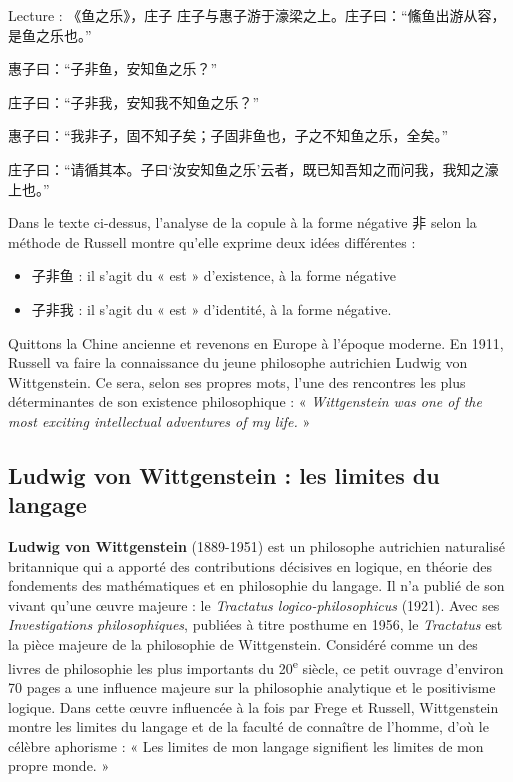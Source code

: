 \begin{lecture}{Lecture : 《鱼之乐》，庄子}
\normalfont
庄子与惠子游于濠梁之上。庄子曰：“鯈鱼出游从容，是鱼之乐也。”

惠子曰：“子非鱼，安知鱼之乐？”

庄子曰：“子非我，安知我不知鱼之乐？”

惠子曰：“我非子，固不知子矣；子固非鱼也，子之不知鱼之乐，全矣。”

庄子曰：“请循其本。子曰‘汝安知鱼之乐’云者，既已知吾知之而问我，我知之濠上也。”
\end{lecture}

Dans le texte ci-dessus, l’analyse de la copule à la forme négative 非 selon la méthode de Russell montre qu’elle exprime deux idées différentes :
\begin{itemize}
\item 子非鱼 : il s’agit du « est » d’existence, à la forme négative
\item 子非我 : il s’agit du « est » d’identité, à la forme négative.
\end{itemize}

Quittons la Chine ancienne et revenons en Europe à l’époque moderne. En 1911, Russell va faire la connaissance du jeune philosophe autrichien Ludwig von Wittgenstein. Ce sera, selon ses propres mots, l’une des rencontres les plus déterminantes de son existence philosophique : « \textit{Wittgenstein was one of the most exciting intellectual adventures of my life.} »

\subsection{Ludwig von Wittgenstein : les limites du langage}
\textbf{Ludwig von Wittgenstein} (1889-1951) est un philosophe autrichien naturalisé britannique qui a apporté des contributions décisives en logique, en théorie des fondements des mathématiques et en philosophie du langage. Il n’a publié de son vivant qu’une œuvre majeure : le \textit{Tractatus logico-philosophicus} (1921). Avec ses \textit{Investigations philosophiques}, publiées à titre posthume en 1956, le \textit{Tractatus} est la pièce majeure de la philosophie de Wittgenstein. Considéré comme un des livres de philosophie les plus importants du 20\textsuperscript{e} siècle, ce petit ouvrage d’environ 70 pages a une influence majeure sur la philosophie analytique et le positivisme logique. Dans cette œuvre influencée à la fois par Frege et Russell, Wittgenstein montre les limites du langage et de la faculté de connaître de l’homme, d’où le célèbre aphorisme : « Les limites de mon langage signifient les limites de mon propre monde. »

